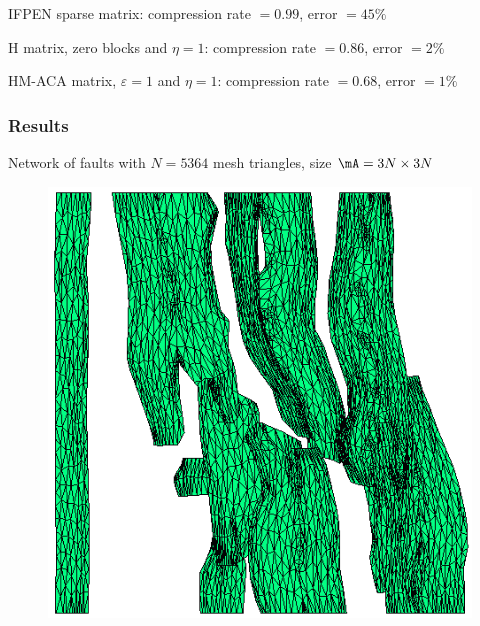 \begin{frame}
\vspace{-5pt}
{\footnotesize
IFPEN sparse matrix: compression rate $=0.99$, error \alert{$=45\%$}

H matrix, zero blocks and $\eta=1$: compression rate $=0.86$, error $=2\%$

HM-ACA matrix, $\varepsilon=1$ and $\eta=1$: compression rate $=0.68$, error \alert{$=1\%$}
}

\end{frame}


\begin{frame}
\frametitle{Results}

\small

Network of \alert{faults} with $N=5364$ mesh triangles, size $\mA=3N\times 3N$
\vspace{-5pt}
\begin{figure}
\centering
\begin{minipage}[c]{.39\linewidth}
\includegraphics[width=.9\textwidth]{../images/visu_maillage5364FracsTriangles.png}
\end{minipage}
\begin{minipage}[c]{.6\linewidth}

\end{minipage}
\end{figure}
\end{frame}
